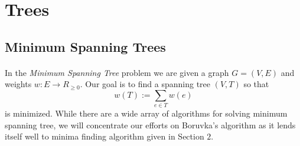\section{Trees}

\subsection{Minimum Spanning Trees}
\paragraph{}
In the {\it Minimum Spanning Tree} problem we are given a graph $G=(V,E)$ and weights $w: E \rightarrow R_{\geq 0}$. Our goal is to find a spanning tree $(V,T)$ so that $$w(T) := \sum_{e \in T} w(e)$$ is minimized. While there are a wide array of algorithms for solving minimum spanning tree, we will concentrate our efforts on Boruvka's algorithm \cite{nevsetvril2001otakar} as it lends itself well to minima finding algorithm given in Section $2$.

